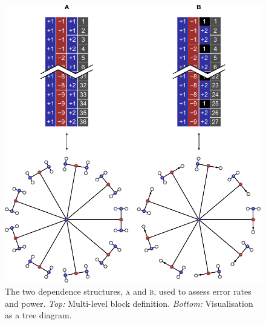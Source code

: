 \begin{figure}[!tp]
\centering
\includegraphics{figures/treesAB.pdf}
\vspace{1cm}
\caption{The two dependence structures, \textsc{a} and \textsc{b}, used to assess error rates and power.
\emph{Top:} Multi-level block definition.
\emph{Bottom:} Visualisation as a tree diagram.} 
\label{fig:treesAB}
\end{figure}

